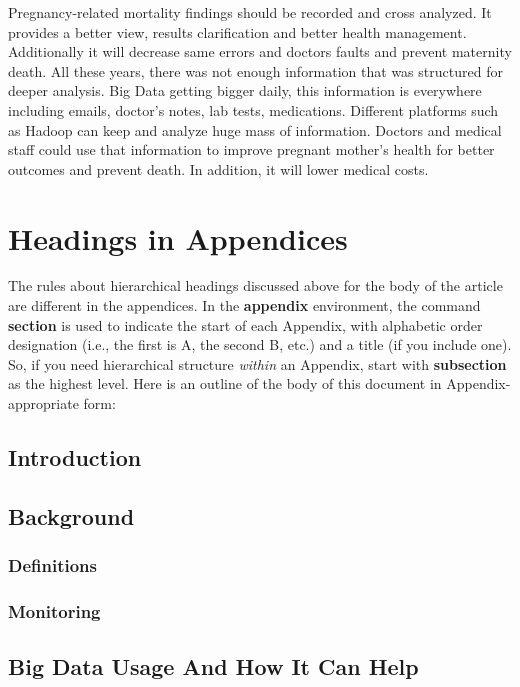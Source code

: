 \documentclass[sigconf]{acmart}
\begin{document}
Pregnancy-related mortality findings should be recorded and cross analyzed. It provides a better view, results clarification and better health management. Additionally it will decrease same errors and doctors faults and prevent maternity death. All these years, there was not enough information that was structured for deeper analysis. Big Data getting bigger daily, this information is everywhere including emails, doctor’s notes, lab tests, medications. Different platforms such as Hadoop can keep and analyze huge mass of information. Doctors and medical staff could use that information to improve pregnant mother’s health for better outcomes and prevent death. In addition, it will lower medical costs.



\appendix

\section{Headings in Appendices}

The rules about hierarchical headings discussed above for the body of
the article are different in the appendices.  In the \textbf{appendix}
environment, the command \textbf{section} is used to indicate the
start of each Appendix, with alphabetic order designation (i.e., the
first is A, the second B, etc.) and a title (if you include one).  So,
if you need hierarchical structure \textit{within} an Appendix, start
with \textbf{subsection} as the highest level. Here is an outline of
the body of this document in Appendix-appropriate form:

\subsection{Introduction}
\subsection{Background}
\subsubsection{Definitions}
\subsubsection{Monitoring}
\subsection{Big Data Usage And How It Can Help}
\end{document}
